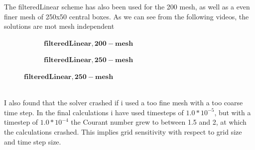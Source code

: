 \documentclass[a4paper,english,11pt,twoside]{article}
\begin{document}
The filteredLinear scheme has also been used for the 200 mesh, as well as a even finer mesh of 250x50 central boxes. As we can see from the following videos, the solutions are mot mesh independent\\
\begin{figure}[h!]
	\begin{subfigure}{0.2\textwidth}
		\caption{$\mathbf{filteredLinear, 200-mesh}$}
 	\end{subfigure}
	\begin{subfigure}{0.2\textwidth}
		\caption{$\mathbf{filteredLinear, 250-mesh}$}
 	\end{subfigure}
\end{figure}
\\
I also found that the solver crashed if i used a too fine mesh with a too coarse time step. In the final calculations i have used timesteps of $1.0*10^{-5}$, but with a timestep of $1.0*10^{-4}$ the Courant number grew to between 1.5 and 2, at which the calculations crashed. This implies grid sensitivity with respect to grid size and time step size.
\end{document}
